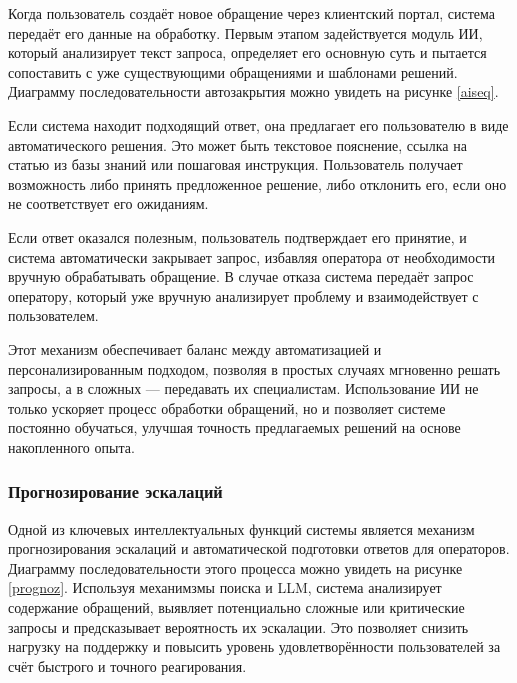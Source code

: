 Когда пользователь создаёт новое обращение через клиентский портал, система передаёт его данные на обработку. Первым этапом задействуется модуль ИИ, который анализирует текст запроса, определяет его основную суть и пытается сопоставить с уже существующими обращениями и шаблонами решений. Диаграмму последовательности автозакрытия можно увидеть на рисунке \ref{aiseq}.


Если система находит подходящий ответ, она предлагает его пользователю в виде автоматического решения. Это может быть текстовое пояснение, ссылка на статью из базы знаний или пошаговая инструкция. Пользователь получает возможность либо принять предложенное решение, либо отклонить его, если оно не соответствует его ожиданиям.

Если ответ оказался полезным, пользователь подтверждает его принятие, и система автоматически закрывает запрос, избавляя оператора от необходимости вручную обрабатывать обращение. В случае отказа система передаёт запрос оператору, который уже вручную анализирует проблему и взаимодействует с пользователем.

Этот механизм обеспечивает баланс между автоматизацией и персонализированным подходом, позволяя в простых случаях мгновенно решать запросы, а в сложных — передавать их специалистам. Использование ИИ не только ускоряет процесс обработки обращений, но и позволяет системе постоянно обучаться, улучшая точность предлагаемых решений на основе накопленного опыта.

\subsubsection{Прогнозирование эскалаций}

Одной из ключевых интеллектуальных функций системы является механизм прогнозирования эскалаций и автоматической подготовки ответов для операторов. Диаграмму последовательности этого процесса можно увидеть на рисунке \ref{prognoz}. Используя механимзмы поиска и LLM, система анализирует содержание обращений, выявляет потенциально сложные или критические запросы и предсказывает вероятность их эскалации. Это позволяет снизить нагрузку на поддержку и повысить уровень удовлетворённости пользователей за счёт быстрого и точного реагирования.


